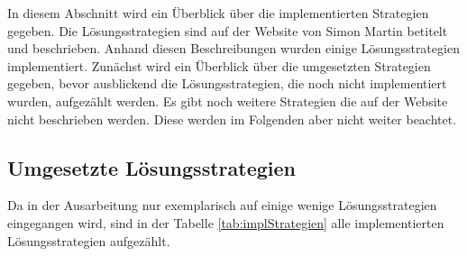 In diesem Abschnitt wird ein Überblick über die implementierten Strategien gegeben. Die Lösungsstrategien sind auf der Website von Simon Martin \cite{martin} betitelt und beschrieben. Anhand diesen Beschreibungen wurden einige Lösungsstrategien implementiert. Zunächst wird ein Überblick über die umgesetzten Strategien gegeben, bevor ausblickend die Lösungsstrategien, die noch nicht implementiert wurden, aufgezählt werden. Es gibt noch weitere Strategien die auf der Website nicht beschrieben werden. Diese werden im Folgenden aber nicht weiter beachtet.

\subsection{Umgesetzte Lösungsstrategien}
Da in der Ausarbeitung nur exemplarisch auf einige wenige Lösungsstrategien eingegangen wird, sind in der Tabelle \ref{tab:implStrategien} alle implementierten Lösungsstrategien aufgezählt.

